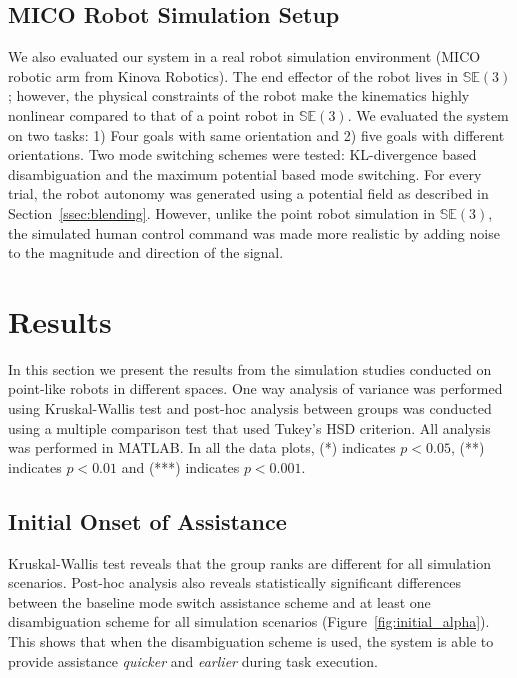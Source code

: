 \documentclass[conference]{IEEEtran}
\begin{document}
\subsection{MICO Robot Simulation Setup}
We also evaluated our system in a real robot simulation environment (MICO robotic arm from Kinova Robotics). The end effector of the robot lives in $\mathbb{SE}(3)$; however, the physical constraints of the robot make the kinematics highly nonlinear compared to that of a point robot in $\mathbb{SE}(3)$. We evaluated the system on two tasks: 1) Four goals with same orientation and 2) five goals with different orientations. Two mode switching schemes were tested: KL-divergence based disambiguation and the maximum potential based mode switching. For every trial, the robot autonomy was generated using a potential field as described in Section~\ref{ssec:blending}. 
However, unlike the point robot simulation in $\mathbb{SE}(3)$, the simulated human control command was made more realistic by adding noise to the magnitude and direction of the signal. 

\section{Results}\label{sec:results}

In this section we present the results from the simulation studies conducted on point-like robots in different spaces. One way analysis of variance was performed using Kruskal-Wallis test and post-hoc analysis between groups was conducted using a multiple comparison test that used Tukey's HSD criterion. All analysis was performed in MATLAB. In all the data plots, (*) indicates $p < 0.05$, (**) indicates $p < 0.01$ and (***) indicates $p < 0.001$.
\subsection{Initial Onset of Assistance}

Kruskal-Wallis test reveals that the group ranks are different for all simulation scenarios. Post-hoc analysis also reveals statistically significant differences between the baseline mode switch assistance scheme and at least one disambiguation scheme for all simulation scenarios (Figure~\ref{fig:initial_alpha}). This shows that when the disambiguation scheme is used, the system is able to provide assistance \textit{quicker} and \textit{earlier} during task execution.
\end{document}
